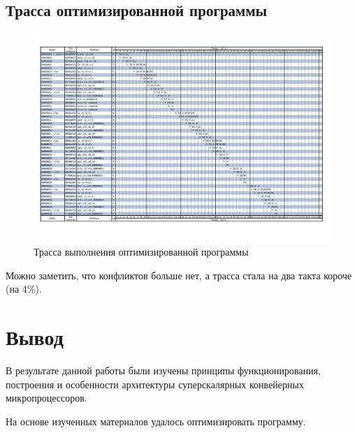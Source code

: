 \documentclass{article}
\begin{document}
\clearpage\subsection{Трасса оптимизированной программы}
\begin{figure}[h]
	\centering
	\includegraphics[scale=0.4]{tools/line_opt.pdf}
          \caption{Трасса выполнения оптимизированной программы}
\end{figure}

Можно заметить, что конфликтов больше нет, а трасса стала на два такта короче (на 4\%).

\section{Вывод}
В результате данной работы были изучены принципы функционирования, построения и особенности архитектуры 
суперскалярных конвейерных микропроцессоров.

На основе изученных материалов удалось оптимизировать программу.
\end{document}
